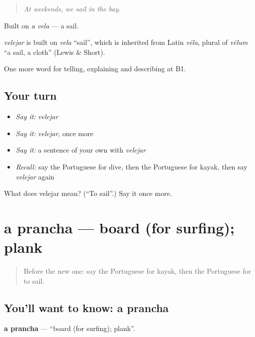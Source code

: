 \begin{quote}
\emph{At weekends, we sail in the bay.}
\end{quote}

Built on \emph{a vela} — a sail.

\begin{cousinweb}
\emph{velejar} is built on \emph{vela} \textquotedblleft{}sail\textquotedblright{}, which is inherited from Latin \emph{vēla}, plural of \emph{vēlum} \textquotedblleft{}a sail, a cloth\textquotedblright{} (Lewis \& Short).
\end{cousinweb}

\begin{grammarlens}[title={What you've built}]
One more word for telling, explaining and describing at B1.
\end{grammarlens}

\subsection*{Your turn}
\begin{itemize}
\raggedright
  \item \emph{Say it:} \emph{velejar}
  \item \emph{Say it:} \emph{velejar}, once more
  \item \emph{Say it:} a sentence of your own with \emph{velejar}
  \item \emph{Recall:} say the Portuguese for dive, then the Portuguese for kayak, then say \emph{velejar} again
\end{itemize}

\begin{tcolorbox}[breakable,colback=teal!4,colframe=teal!35!black,title={Before you move on}]
What does velejar mean? (\textquotedblleft{}To sail\textquotedblright{}.) Say it once more.
\end{tcolorbox}
\section[a prancha]{a prancha — board (for surfing); plank}

\label{lesson:PT-C506-prancha}



\begin{quote}
Before the new one: say the Portuguese for kayak, then the Portuguese for to sail.
\end{quote}

\subsection*{You'll want to know: a prancha}
\textbf{a prancha} — \textquotedblleft{}board (for surfing); plank\textquotedblright{}.

